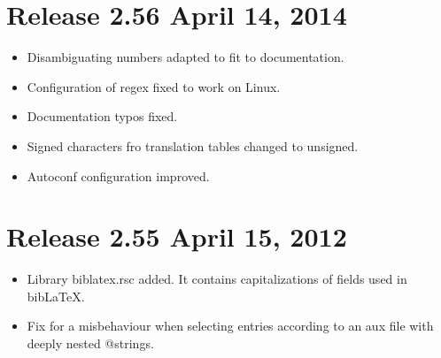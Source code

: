 \documentclass[11pt,a4paper]{scrartcl}
\newcommand\File[1]{\textsf{#1}}
\newenvironment{Release}[2]{%
  \def\tmp{#2}%
  \section*{Release #1 \ifx\tmp\empty\else{\normalsize[#2]}\fi}
  \begin{itemize}
}{\end{itemize}}
\newenvironment{Fix}[1]{\item }{}
\newenvironment{New}[1]{\item }{}
\begin{document}
\begin{multicols}
 \begin{Release}{2.56}{April 14, 2014}
  \begin{Fix}{gene}
    Disambiguating numbers adapted to fit to documentation.
  \end{Fix}
  \begin{Fix}{gene}
    Configuration of regex fixed to work on Linux.
  \end{Fix}
  \begin{Fix}{gene}
    Documentation typos fixed.
  \end{Fix}
  \begin{Fix}{gene}
    Signed characters fro translation tables changed to unsigned.
  \end{Fix}
  \begin{Fix}{gene}
    Autoconf configuration improved.
  \end{Fix}
 \end{Release}

 \begin{Release}{2.55}{April 15, 2012}
  \begin{New}{gene}
    Library \File{biblatex.rsc} added. It contains capitalizations of
    fields used in bib\LaTeX.
  \end{New}
  \begin{Fix}{gene}
    Fix for a misbehaviour when selecting entries according to an aux file
    with deeply nested @strings.
  \end{Fix}
 \end{Release}


\end{multicols}
\end{document}
